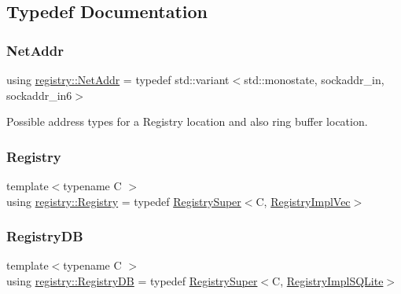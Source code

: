 \subsection{Typedef Documentation}
\mbox{\label{namespaceregistry_a2d7eac31eb792025667bcebdfe93dbf2}} 
\subsubsection{\texorpdfstring{Net\+Addr}{NetAddr}}
{\footnotesize\ttfamily using \hyperlink{namespaceregistry_a2d7eac31eb792025667bcebdfe93dbf2}{registry\+::\+Net\+Addr} = typedef std\+::variant$<$std\+::monostate, sockaddr\+\_\+in, sockaddr\+\_\+in6$>$}



Possible address types for a Registry location and also ring buffer location. 

\mbox{\label{namespaceregistry_acde3104226ae0b7a590efe949ddec8e2}} 
\subsubsection{\texorpdfstring{Registry}{Registry}}
{\footnotesize\ttfamily template$<$typename C $>$ \\
using \hyperlink{namespaceregistry_acde3104226ae0b7a590efe949ddec8e2}{registry\+::\+Registry} = typedef \hyperlink{classregistry_1_1RegistrySuper}{Registry\+Super}$<$C, \hyperlink{classregistry_1_1RegistryImplVec}{Registry\+Impl\+Vec}$>$}

\mbox{\label{namespaceregistry_a6cd2ff083e7825c966c206645cafcc0f}} 
\subsubsection{\texorpdfstring{Registry\+DB}{RegistryDB}}
{\footnotesize\ttfamily template$<$typename C $>$ \\
using \hyperlink{namespaceregistry_a6cd2ff083e7825c966c206645cafcc0f}{registry\+::\+Registry\+DB} = typedef \hyperlink{classregistry_1_1RegistrySuper}{Registry\+Super}$<$C, \hyperlink{classregistry_1_1RegistryImplSQLite}{Registry\+Impl\+S\+Q\+Lite}$>$}



